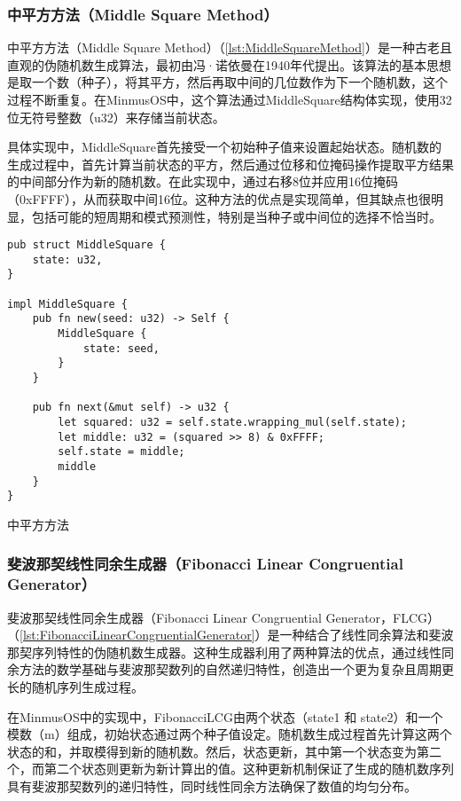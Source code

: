 \subsubsection{中平方方法（Middle Square Method）}

中平方方法（Middle Square Method）（\cref{lst:MiddleSquareMethod}）是一种古老且直观的伪随机数生成算法，最初由冯·诺依曼在1940年代提出。该算法的基本思想是取一个数（种子），将其平方，然后再取中间的几位数作为下一个随机数，这个过程不断重复。在MinmusOS中，这个算法通过MiddleSquare结构体实现，使用32位无符号整数（u32）来存储当前状态。

具体实现中，MiddleSquare首先接受一个初始种子值来设置起始状态。随机数的生成过程中，首先计算当前状态的平方，然后通过位移和位掩码操作提取平方结果的中间部分作为新的随机数。在此实现中，通过右移8位并应用16位掩码（0xFFFF），从而获取中间16位。这种方法的优点是实现简单，但其缺点也很明显，包括可能的短周期和模式预测性，特别是当种子或中间位的选择不恰当时。

\begin{listing}[htbp]
    \begin{verbatim}
pub struct MiddleSquare {
    state: u32,
}

impl MiddleSquare {
    pub fn new(seed: u32) -> Self {
        MiddleSquare {
            state: seed,
        }
    }

    pub fn next(&mut self) -> u32 {
        let squared: u32 = self.state.wrapping_mul(self.state);
        let middle: u32 = (squared >> 8) & 0xFFFF;
        self.state = middle;
        middle
    }
}
    \end{verbatim}
    \caption{中平方方法}\label{lst:MiddleSquareMethod}
\end{listing}

\subsubsection{斐波那契线性同余生成器（Fibonacci Linear Congruential Generator）}

斐波那契线性同余生成器（Fibonacci Linear Congruential Generator，FLCG）（\cref{lst:FibonacciLinearCongruentialGenerator}）是一种结合了线性同余算法和斐波那契序列特性的伪随机数生成器。这种生成器利用了两种算法的优点，通过线性同余方法的数学基础与斐波那契数列的自然递归特性，创造出一个更为复杂且周期更长的随机序列生成过程。

在MinmusOS中的实现中，FibonacciLCG由两个状态（state1 和 state2）和一个模数（m）组成，初始状态通过两个种子值设定。随机数生成过程首先计算这两个状态的和，并取模得到新的随机数。然后，状态更新，其中第一个状态变为第二个，而第二个状态则更新为新计算出的值。这种更新机制保证了生成的随机数序列具有斐波那契数列的递归特性，同时线性同余方法确保了数值的均匀分布。

